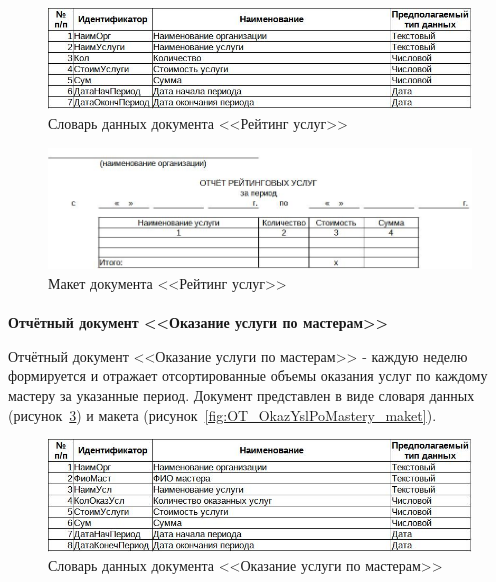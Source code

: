 \documentclass[12pt, a4paper, simple]{eskdtext}
\begin{document}
    \begin{figure}[!h]
        \centering
        \includegraphics[width=14cm]
            {_docs/ОТ_РейтУслуг_типы.jpg}
        \caption{Словарь данных документа <<Рейтинг услуг>>}
        \label{fig:OT_ReitYslyg_tipi}
    \end{figure}

    \begin{figure}[!h]
        \centering
        \includegraphics[width=14cm]
            {_docs/ОТ_РейтУслуг_макет.jpg}
        \caption{Макет документа <<Рейтинг услуг>>}
        \label{fig:OT_ReitYslyg_maket}
    \end{figure}

    \newpage
    \paragraph{} \textbf{Отчётный документ <<Оказание услуги по мастерам>>}

    Отчётный документ <<Оказание услуги по мастерам>>
    - каждую неделю формируется и отражает отсортированные объемы оказания услуг по каждому мастеру за указанные период.
    Документ представлен в виде словаря данных (рисунок~\ref{fig:OT_OkazYslPoMastery_tipi})
    и макета (рисунок~\ref{fig:OT_OkazYslPoMastery_maket}).

    \begin{figure}[!h]
        \centering
        \includegraphics[width=14cm]
            {_docs/ОТ_ОказУслПоМастеру_типы.jpg}
        \caption{Словарь данных документа <<Оказание услуги по мастерам>>}
        \label{fig:OT_OkazYslPoMastery_tipi}
    \end{figure}
\end{document}
